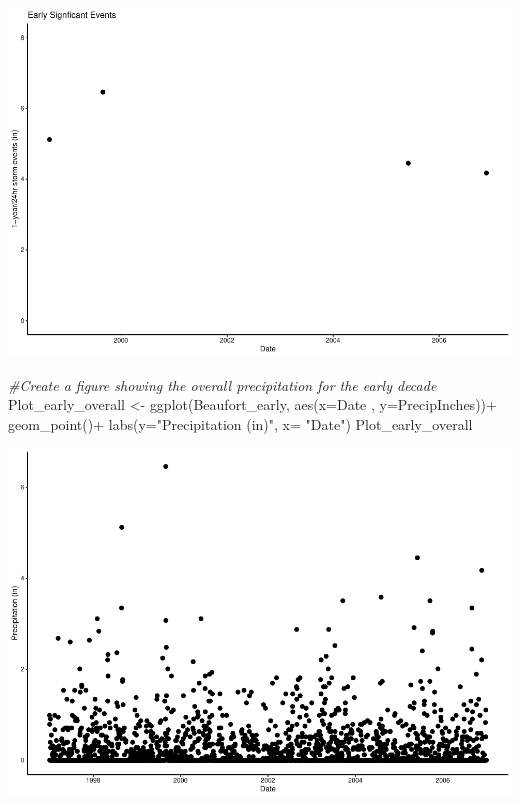 \documentclass[
  12pt,
]{article}
\newenvironment{Shaded}{\begin{snugshade}}{\end{snugshade}}
\newcommand{\AttributeTok}[1]{\textcolor[rgb]{0.77,0.63,0.00}{#1}}
\newcommand{\CommentTok}[1]{\textcolor[rgb]{0.56,0.35,0.01}{\textit{#1}}}
\newcommand{\FunctionTok}[1]{\textcolor[rgb]{0.00,0.00,0.00}{#1}}
\newcommand{\NormalTok}[1]{#1}
\newcommand{\OtherTok}[1]{\textcolor[rgb]{0.56,0.35,0.01}{#1}}
\newcommand{\SpecialCharTok}[1]{\textcolor[rgb]{0.00,0.00,0.00}{#1}}
\newcommand{\StringTok}[1]{\textcolor[rgb]{0.31,0.60,0.02}{#1}}
\begin{document}
\includegraphics{Project_Template_TLK_files/figure-latex/early-1.pdf}

\begin{Shaded}
\begin{Highlighting}[]
\CommentTok{\#Create a figure showing the overall precipitation for the early decade}
\NormalTok{Plot\_early\_overall }\OtherTok{\textless{}{-}} \FunctionTok{ggplot}\NormalTok{(Beaufort\_early, }\FunctionTok{aes}\NormalTok{(}\AttributeTok{x=}\NormalTok{Date , }\AttributeTok{y=}\NormalTok{PrecipInches))}\SpecialCharTok{+}
  \FunctionTok{geom\_point}\NormalTok{()}\SpecialCharTok{+}
  \FunctionTok{labs}\NormalTok{(}\AttributeTok{y=}\StringTok{"Precipitation (in)"}\NormalTok{, }\AttributeTok{x=} \StringTok{"Date"}\NormalTok{)}
\NormalTok{Plot\_early\_overall}
\end{Highlighting}
\end{Shaded}

\includegraphics{Project_Template_TLK_files/figure-latex/early-2.pdf}
\end{document}
